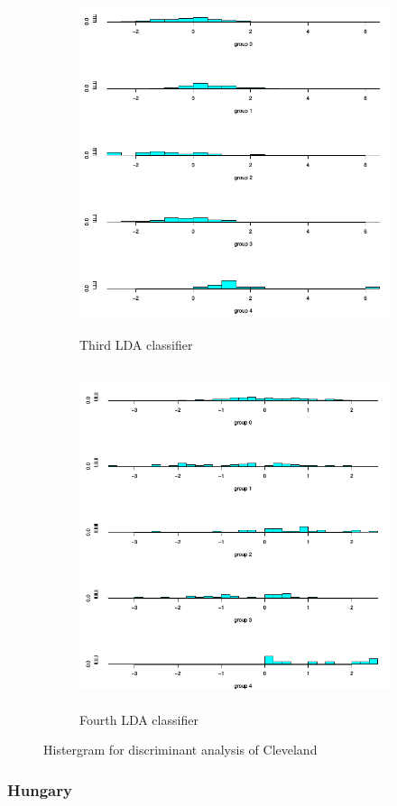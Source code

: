 \documentclass[a4paper]{article}
\begin{document}
\begin{figure}[H]
	\begin{subfigure}{0.5\textwidth}
		\caption{Third LDA classifier}
		\includegraphics[width=0.9\linewidth, height=10cm]{Q4_pics/Clev-Hist3.png}
	\end{subfigure}
	\begin{subfigure}{0.5\textwidth}
		\caption{Fourth LDA classifier}
		\includegraphics[width=0.9\linewidth, height=10cm]{Q4_pics/Clev-Hist4.png}
	\end{subfigure}
	\caption{Histergram for discriminant analysis of Cleveland}
	\label{q4_clev_historgrams}
\end{figure}

\newpage
\subsubsection{Hungary}
\end{document}
